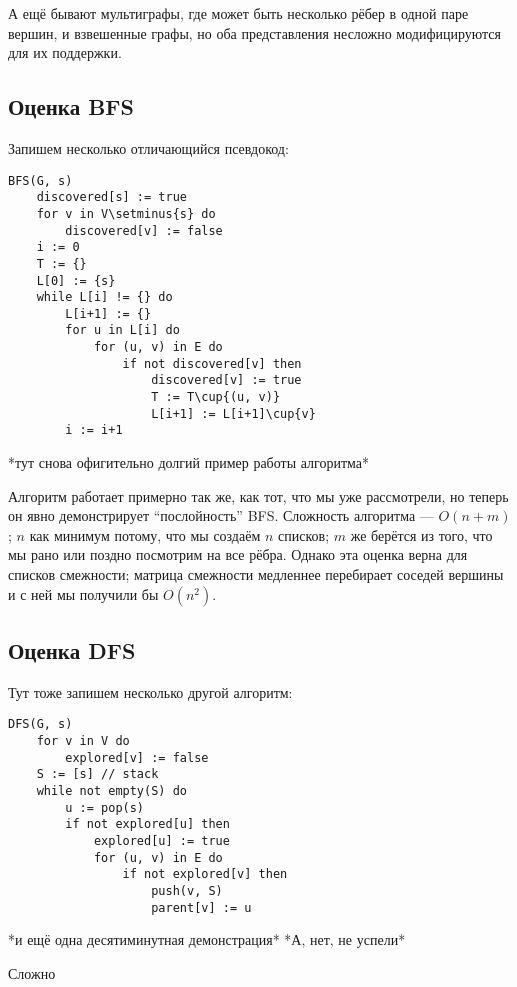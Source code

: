 А ещё бывают мультиграфы, где может быть несколько рёбер в одной паре вершин, и взвешенные графы, но оба представления несложно модифицируются для их поддержки.

\subsection{Оценка BFS}

Запишем несколько отличающийся псевдокод:
%

\begin{lstlisting}
BFS(G, s)
    discovered[s] := true
    for v in V\setminus{s} do
        discovered[v] := false
    i := 0
    T := {}
    L[0] := {s}
    while L[i] != {} do
        L[i+1] := {}
        for u in L[i] do
            for (u, v) in E do
                if not discovered[v] then
                    discovered[v] := true
                    T := T\cup{(u, v)}
                    L[i+1] := L[i+1]\cup{v}
        i := i+1
\end{lstlisting}

*тут снова офигительно долгий пример работы алгоритма* 

Алгоритм работает примерно так же, как тот, что мы уже рассмотрели, но теперь он явно демонстрирует ``послойность'' BFS. Сложность алгоритма --- $O(n+m)$; $n$ как минимум потому, что мы создаём $n$ списков; $m$ же берётся из того, что мы рано или поздно посмотрим на все рёбра. Однако эта оценка верна для списков смежности; матрица смежности медленнее перебирает соседей вершины и с ней мы получили бы $O(n^2)$.

\subsection{Оценка DFS}

Тут тоже запишем несколько другой алгоритм:

\begin{lstlisting}
DFS(G, s)
    for v in V do
        explored[v] := false
    S := [s] // stack
    while not empty(S) do
        u := pop(s)
        if not explored[u] then
            explored[u] := true
            for (u, v) in E do
                if not explored[v] then
                    push(v, S)
                    parent[v] := u
\end{lstlisting}

*и ещё одна десятиминутная демонстрация* *А, нет, не успели*

Сложно

